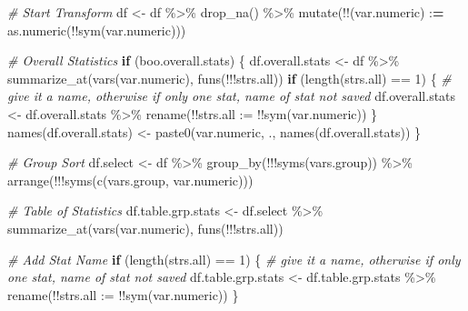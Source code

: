 \documentclass[
]{book}
\newenvironment{Shaded}{\begin{snugshade}}{\end{snugshade}}
\newcommand{\AttributeTok}[1]{\textcolor[rgb]{0.77,0.63,0.00}{#1}}
\newcommand{\CommentTok}[1]{\textcolor[rgb]{0.56,0.35,0.01}{\textit{#1}}}
\newcommand{\ControlFlowTok}[1]{\textcolor[rgb]{0.13,0.29,0.53}{\textbf{#1}}}
\newcommand{\DecValTok}[1]{\textcolor[rgb]{0.00,0.00,0.81}{#1}}
\newcommand{\ErrorTok}[1]{\textcolor[rgb]{0.64,0.00,0.00}{\textbf{#1}}}
\newcommand{\FunctionTok}[1]{\textcolor[rgb]{0.00,0.00,0.00}{#1}}
\newcommand{\NormalTok}[1]{#1}
\newcommand{\OtherTok}[1]{\textcolor[rgb]{0.56,0.35,0.01}{#1}}
\newcommand{\SpecialCharTok}[1]{\textcolor[rgb]{0.00,0.00,0.00}{#1}}
\newcommand{\StringTok}[1]{\textcolor[rgb]{0.31,0.60,0.02}{#1}}
\begin{document}
\begin{Shaded}
\begin{Highlighting}[]
  \CommentTok{\# Start Transform}
\NormalTok{  df }\OtherTok{\textless{}{-}}\NormalTok{ df }\SpecialCharTok{\%\textgreater{}\%} \FunctionTok{drop\_na}\NormalTok{() }\SpecialCharTok{\%\textgreater{}\%} 
    \FunctionTok{mutate}\NormalTok{(}\SpecialCharTok{!!}\NormalTok{(var.numeric) }\SpecialCharTok{:}\ErrorTok{=} \FunctionTok{as.numeric}\NormalTok{(}\SpecialCharTok{!!}\FunctionTok{sym}\NormalTok{(var.numeric)))}
  
  \CommentTok{\# Overall Statistics}
  \ControlFlowTok{if}\NormalTok{ (boo.overall.stats) \{}
\NormalTok{    df.overall.stats }\OtherTok{\textless{}{-}}\NormalTok{ df }\SpecialCharTok{\%\textgreater{}\%} 
      \FunctionTok{summarize\_at}\NormalTok{(}\FunctionTok{vars}\NormalTok{(var.numeric), }\FunctionTok{funs}\NormalTok{(}\SpecialCharTok{!!!}\NormalTok{strs.all))}
    \ControlFlowTok{if}\NormalTok{ (}\FunctionTok{length}\NormalTok{(strs.all) }\SpecialCharTok{==} \DecValTok{1}\NormalTok{) \{}
      \CommentTok{\# give it a name, otherwise if only one stat, name of stat not saved}
\NormalTok{      df.overall.stats }\OtherTok{\textless{}{-}}\NormalTok{ df.overall.stats }\SpecialCharTok{\%\textgreater{}\%} 
        \FunctionTok{rename}\NormalTok{(}\SpecialCharTok{!!}\AttributeTok{strs.all :=} \SpecialCharTok{!!}\FunctionTok{sym}\NormalTok{(var.numeric))}
\NormalTok{    \}}
    \FunctionTok{names}\NormalTok{(df.overall.stats) }\OtherTok{\textless{}{-}} 
      \FunctionTok{paste0}\NormalTok{(var.numeric, }\StringTok{\textquotesingle{}.\textquotesingle{}}\NormalTok{, }\FunctionTok{names}\NormalTok{(df.overall.stats))}
\NormalTok{  \}}
  
  \CommentTok{\# Group Sort}
\NormalTok{  df.select }\OtherTok{\textless{}{-}}\NormalTok{ df }\SpecialCharTok{\%\textgreater{}\%}
    \FunctionTok{group\_by}\NormalTok{(}\SpecialCharTok{!!!}\FunctionTok{syms}\NormalTok{(vars.group)) }\SpecialCharTok{\%\textgreater{}\%}
    \FunctionTok{arrange}\NormalTok{(}\SpecialCharTok{!!!}\FunctionTok{syms}\NormalTok{(}\FunctionTok{c}\NormalTok{(vars.group, var.numeric)))}
  
  \CommentTok{\# Table of Statistics}
\NormalTok{  df.table.grp.stats }\OtherTok{\textless{}{-}}\NormalTok{ df.select }\SpecialCharTok{\%\textgreater{}\%} 
    \FunctionTok{summarize\_at}\NormalTok{(}\FunctionTok{vars}\NormalTok{(var.numeric), }\FunctionTok{funs}\NormalTok{(}\SpecialCharTok{!!!}\NormalTok{strs.all))}
  
  \CommentTok{\# Add Stat Name}
  \ControlFlowTok{if}\NormalTok{ (}\FunctionTok{length}\NormalTok{(strs.all) }\SpecialCharTok{==} \DecValTok{1}\NormalTok{) \{}
    \CommentTok{\# give it a name, otherwise if only one stat, name of stat not saved}
\NormalTok{    df.table.grp.stats }\OtherTok{\textless{}{-}}\NormalTok{ df.table.grp.stats }\SpecialCharTok{\%\textgreater{}\%} 
      \FunctionTok{rename}\NormalTok{(}\SpecialCharTok{!!}\AttributeTok{strs.all :=} \SpecialCharTok{!!}\FunctionTok{sym}\NormalTok{(var.numeric))}
\NormalTok{  \}}
  

\end{Highlighting}
\end{Shaded}
\end{document}
